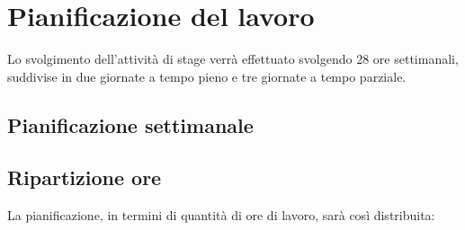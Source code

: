 
\section*{Pianificazione del lavoro}

Lo svolgimento dell'attività di stage verrà effettuato svolgendo 28 ore settimanali, suddivise in due giornate a tempo pieno e tre giornate a tempo parziale.

\subsection*{Pianificazione settimanale}
\prospettoSettimanale

\newpage

\subsection*{Ripartizione ore}

La pianificazione, in termini di quantità di ore di lavoro, sarà così distribuita:

\begin{center}
    
\end{center}

\newpage